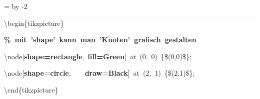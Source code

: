 \begingroup
\ttfamily
{}
=\textwidth
\advance{} by -2\fboxsep
\noindent
\colorbox{background}
{%
\parbox{\dimen255}
{%
\rule[-0.5ex]{0pt}{2.5ex}\hspace*{0.0em}\textbackslash{}begin\{tikzpicture\}\\
\rule[-0.5ex]{0pt}{2.5ex}\hspace*{1.0em}\textcolor{G}{\textbf{\%~mit~'shape'~kann~man~'Knoten'~grafisch~gestalten}}\\
\rule[-0.5ex]{0pt}{2.5ex}\hspace*{1.0em}\textbackslash{}node[\textcolor{R}{\textbf{shape=rectangle}},~\textcolor{R}{\textbf{fill=Green}}]~at~(0,~0)~\{\$(0,0)\$\};\\
\rule[-0.5ex]{0pt}{2.5ex}\hspace*{1.0em}\textbackslash{}node[\textcolor{R}{\textbf{shape=circle}},~~~~\textcolor{R}{\textbf{draw=Black}}]~at~(2,~1)~\{\$(2,1)\$\};\\
\rule[-0.5ex]{0pt}{2.5ex}\hspace*{0.0em}\textbackslash{}end\{tikzpicture\}}%
}%
\endgroup
